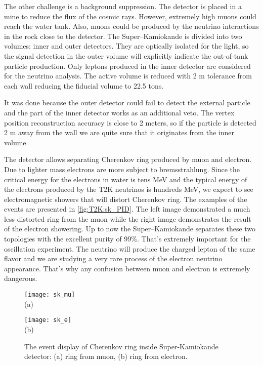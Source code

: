 \documentclass[../main.tex]{subfiles}
\begin{document}
The other challenge is a background suppression. The detector is placed in a mine to reduce the flux of the cosmic rays. However, extremely high muons could reach the water tank. Also, muons could be produced by the neutrino interactions in the rock close to the detector. The Super--Kamiokande is divided into two volumes: inner and outer detectors. They are optically isolated for the light, so the signal detection in the outer volume will explicitly indicate the out-of-tank particle production. Only leptons produced in the inner detector are considered for the neutrino analysis. The active volume is reduced with 2 m tolerance from each wall reducing the fiducial volume to 22.5 tons. 


It was done because the outer detector could fail to detect the external particle and the part of the inner detector works as an additional veto. The vertex position reconstruction accuracy is close to 2 meters, so if the particle is detected 2 m away from the wall we are quite sure that it originates from the inner volume.

The detector allows separating Cherenkov ring produced by muon and electron. Due to lighter mass electrons are more subject to bremsstrahlung. Since the critical energy for the electrons in water is tens MeV and the typical energy of the electrons produced by the T2K neutrinos is hundreds MeV, we expect to see electromagnetic showers that will distort Cherenkov ring. The examples of the events are presented in \autoref{fig:T2K:sk_PID}. The left image demonstrated a much less distorted ring from the muon while the right image demonstrates the result of the electron showering. Up to now the Super--Kamiokande separates these two topologies with the excellent purity of 99\%. That's extremely important for the oscillation experiment. The neutrino will produce the charged lepton of the same flavor and we are studying a very rare process of the electron neutrino appearance. That's why any confusion between muon and electron is extremely dangerous.

\begin{figure}[!ht]
  \centering
  \begin{minipage}{0.49\linewidth}
    \centering
    \texttt{[image: sk\_mu]} \\ (a)
  \end{minipage}
  \begin{minipage}{0.49\linewidth}
    \centering
    \texttt{[image: sk\_e]} \\ (b)
  \end{minipage}
    \caption{The event display of Cherenkov ring inside Super-Kamiokande detector: (a) ring from muon, (b) ring from electron.}
    \label{fig:T2K:sk_PID}
\end{figure}
\end{document}
